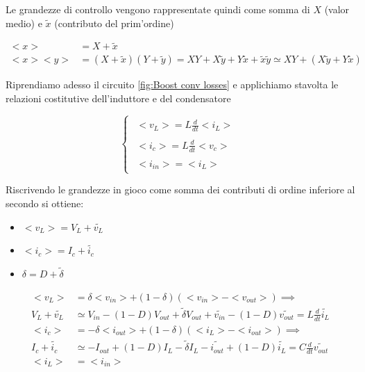 \documentclass{article}
\begin{document}
\noindent
Le grandezze di controllo vengono rappresentate quindi come somma di \(X\) (valor medio) e \( \tilde{x}\) (contributo del prim'ordine) 

\vspace{0.5em}
\begin{align*}
    <x> &= X + \tilde{x} \\
    <x><y> &= (X + \tilde{x})(Y + \tilde{y}) = XY + X\tilde{y} + Y \tilde{x} + \tilde{x}\tilde{y} \simeq XY + ( X\tilde{y} + Y \tilde{x} )
\end{align*}
\vspace{0.5em}

\noindent
Riprendiamo adesso il circuito \autoref{fig:Boost conv losses} e applichiamo stavolta le relazioni costitutive dell'induttore e del condensatore

\vspace{0.5em}
\[
\begin{cases}
    \begin{aligned}
       <v_L> = L \frac{d}{dt}<i_L>
    \end{aligned}
       \\[2em]
    \begin{aligned}
       <i_c> = L \frac{d}{dt}<v_c>
    \end{aligned}
       \\[2em]
    \begin{aligned}
       <i_{in}> = <i_L>
    \end{aligned}
\end{cases}
\]
\vspace{0.5em}

\noindent
Riscrivendo le grandezze in gioco come somma dei contributi di ordine inferiore al secondo si ottiene:

\begin{itemize}
    \item \(<v_L> = V_L + \tilde{v_L}\)
    \item \(<i_c> = I_c + \tilde{i_c}\)
    \item \(\delta = D + \tilde{\delta}\)
\end{itemize}

\vspace{0.5em}
\begin{align*}
    <v_L> &= \delta <v_{in}> + (1-\delta)(<v_{in}>-<v_{out}>) \implies \\
    V_L + \tilde{v_L} &\simeq V_{in} - (1-D)V_{out} + \tilde{\delta}V_{out}+\tilde{v_{in}} - (1-D)\tilde{v_{out}} = L \frac{d}{dt}\tilde{i_L}
    \\[2em]
    <i_c> &= -\delta <i_{out}> + (1-\delta)(<i_{L}>-<i_{out}>) \implies \\
    I_c + \tilde{i_c} &\simeq -I_{out} + (1-D)I_{L} - \tilde{\delta}I_{L} -\tilde{i_{out}} + (1-D)\tilde{i_{L}} = C \frac{d}{dt}\tilde{v_{out}}
    \\[2em]
    <i_L> &= <i_{in}>
\end{align*}
\vspace{0.5em}
\end{document}
